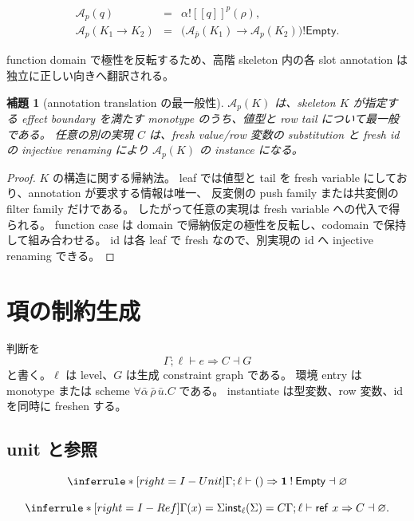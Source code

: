 \documentclass[uplatex,dvipdfmx,a4paper,10.5pt]{jsarticle}
\theoremstyle{jpplain}
\newtheorem{lemma}[definition]{補題}
\newcommand{\Empty}{\mathsf{Empty}}
\newcommand{\Unit}{\mathbf 1}
\newcommand{\inst}{\mathsf{inst}}
\newcommand{\comp}{\mathbin{!}}
\newcommand{\kw}[1]{\mathsf{#1}}
\newcommand{\sem}[1]{[\![#1]\!]}
\begin{document}
\[
\begin{array}{rcl}
\mathcal A_p(q)&=&\alpha\comp\sem{q}^p(\rho),\\
\mathcal A_p(K_1\to K_2)&=&
  \bigl(\mathcal A_{\overline p}(K_1)\to\mathcal A_p(K_2)\bigr)\comp\Empty.
\end{array}
\]

function domain で極性を反転するため、高階 skeleton 内の各 slot annotation は独立に正しい向きへ翻訳される。

\begin{lemma}[annotation translation の最一般性]
$\mathcal A_p(K)$ は、skeleton $K$ が指定する effect boundary を満たす monotype のうち、値型と row tail について最一般である。
任意の別の実現 $C$ は、fresh value/row 変数の substitution と fresh id の injective renaming により
$\mathcal A_p(K)$ の instance になる。
\end{lemma}

\begin{proof}
$K$ の構造に関する帰納法。
leaf では値型と tail を fresh variable にしており、annotation が要求する情報は唯一、
反変側の push family または共変側の filter family だけである。
したがって任意の実現は fresh variable への代入で得られる。
function case は domain で帰納仮定の極性を反転し、codomain で保持して組み合わせる。
id は各 leaf で fresh なので、別実現の id へ injective renaming できる。
\end{proof}

\section{項の制約生成}

判断を
\[
  \Gamma;\ell\vdash e\Rightarrow C\dashv G
\]
と書く。$\ell$ は level、$G$ は生成 constraint graph である。
環境 entry は monotype または scheme
$\forall\bar\alpha\,\bar\rho\,\bar u.C$ である。
instantiate は型変数、row 変数、id を同時に freshen する。

\subsection{unit と参照}

\[
\inferrule*[right=I-Unit]
 { }
 {\Gamma;\ell\vdash ()\Rightarrow \Unit\comp\Empty\dashv\varnothing}
\]

\[
\inferrule*[right=I-Ref]
 {\Gamma(x)=\Sigma\\\inst_\ell(\Sigma)=C}
 {\Gamma;\ell\vdash \kw{ref}\ x\Rightarrow C\dashv\varnothing}.
\]
\end{document}
